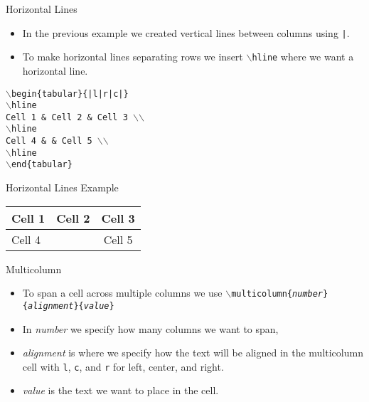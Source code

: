 \documentclass[pdf]{prosper}
\begin{document}
\begin{slide}{Horizontal Lines}
	\begin{itemize}
		\item In the previous example we created vertical lines between columns using \texttt{|}.
		\item To make horizontal lines separating rows we insert \texttt{$\backslash$hline} where we want a horizontal line.
	\end{itemize}
	\texttt{$\backslash$begin\{tabular\}\{|l|r|c|\}} \\
	\texttt{$\backslash$hline} \\
	\texttt{Cell 1 \& Cell 2 \& Cell 3 $\backslash$$\backslash$} \\
	\texttt{$\backslash$hline} \\
	\texttt{Cell 4 \& \& Cell 5 $\backslash$$\backslash$} \\
	\texttt{$\backslash$hline} \\
	\texttt{$\backslash$end\{tabular\}}
\end{slide}
\begin{slide}{Horizontal Lines Example}
	\begin{tabular}{|l|r|c|}
	\hline
	Cell 1 & Cell 2 & Cell 3 \\
	\hline
	Cell 4 & & Cell 5 \\
	\hline
	\end{tabular}
\end{slide}
\begin{slide}{Multicolumn}
	\begin{itemize}
		\item To span a cell across multiple columns we use \texttt{$\backslash$multicolumn\{\textit{number}\}\{\textit{alignment}\}\{\textit{value}\}}
		\item In \textit{number} we specify how many columns we want to span, 
		\item \textit{alignment} is where we specify how the text will be aligned in the multicolumn cell with \texttt{l}, \texttt{c}, and \texttt{r} for left, center, and right.
		\item \textit{value} is the text we want to place in the cell.
	\end{itemize}
\end{slide}
\end{document}
